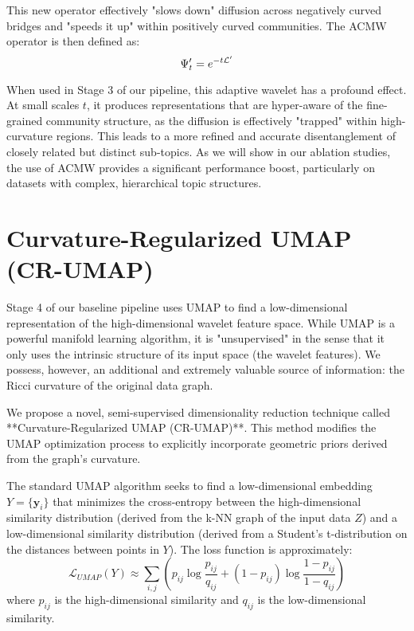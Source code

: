 This new operator effectively "slows down" diffusion across negatively curved bridges and "speeds it up" within positively curved communities. The ACMW operator is then defined as:
\begin{equation}
    \Psi'_{t} = e^{-t\mathcal{L}'}
\end{equation}

When used in Stage 3 of our pipeline, this adaptive wavelet has a profound effect. At small scales $t$, it produces representations that are hyper-aware of the fine-grained community structure, as the diffusion is effectively "trapped" within high-curvature regions. This leads to a more refined and accurate disentanglement of closely related but distinct sub-topics. As we will show in our ablation studies, the use of ACMW provides a significant performance boost, particularly on datasets with complex, hierarchical topic structures.

\section{Curvature-Regularized UMAP (CR-UMAP)}
\label{sec:cr_umap}
Stage 4 of our baseline pipeline uses UMAP to find a low-dimensional representation of the high-dimensional wavelet feature space. While UMAP is a powerful manifold learning algorithm, it is "unsupervised" in the sense that it only uses the intrinsic structure of its input space (the wavelet features). We possess, however, an additional and extremely valuable source of information: the Ricci curvature of the original data graph.

We propose a novel, semi-supervised dimensionality reduction technique called **Curvature-Regularized UMAP (CR-UMAP)**. This method modifies the UMAP optimization process to explicitly incorporate geometric priors derived from the graph's curvature.

The standard UMAP algorithm seeks to find a low-dimensional embedding $Y = \{\bm{y}_i\}$ that minimizes the cross-entropy between the high-dimensional similarity distribution (derived from the k-NN graph of the input data $Z$) and a low-dimensional similarity distribution (derived from a Student's t-distribution on the distances between points in $Y$). The loss function is approximately:
\begin{equation}
    \mathcal{L}_{UMAP}(Y) \approx \sum_{i,j} \left( p_{ij} \log \frac{p_{ij}}{q_{ij}} + (1-p_{ij}) \log \frac{1-p_{ij}}{1-q_{ij}} \right)
\end{equation}
where $p_{ij}$ is the high-dimensional similarity and $q_{ij}$ is the low-dimensional similarity.

